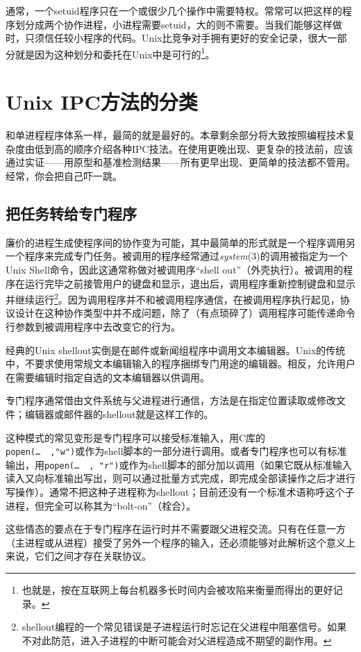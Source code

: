 \documentclass[12pt,oneside]{ctexbook}
\begin{document}
\begin{common-format}
通常，一个setuid程序只在一个或很少几个操作中需要特权。常常可以把这样的程序划分成两个协作进程，小进程需要setuid，大的则不需要。当我们能够这样做时，只须信任较小程序的代码。Unix比竞争对手拥有更好的安全记录，很大一部分就是因为这种划分和委托在Unix中是可行的\footnote{也就是，按在互联网上每台机器多长时间内会被攻陷来衡量而得出的更好记录。}。


\section{Unix IPC方法的分类}
和单进程程序体系一样，最简的就是最好的。本章剩余部分将大致按照编程技术复杂度由低到高的顺序介绍各种IPC技法。在使用更晚出现、更复杂的技法前，应该通过实证——用原型和基准检测结果——所有更早出现、更简单的技法都不管用。经常，你会把自己吓一跳。

\subsection{把任务转给专门程序}
廉价的进程生成使程序间的协作变为可能，其中最简单的形式就是一个程序调用另一个程序来完成专门任务。被调用的程序经常通过\textit{system}(3)的调用被指定为一个Unix Shell命令，因此这通常称做对被调用序“shell out”（外壳执行）。被调用的程序在运行完毕之前接管用户的键盘和显示，退出后，调用程序重新控制键盘和显示并继续运行\footnote{shellout编程的一个常见错误是子进程运行时忘记在父进程中阻塞信号。如果不对此防范，进入子进程的中断可能会对父进程造成不期望的副作用。}。因为调用程序并不和被调用程序通信，在被调用程序执行起见，协议设计在这种协作类型中并不成问题，除了（有点琐碎了）调用程序可能传递命令行参数到被调用程序中去改变它的行为。

经典的Unix shellout实倒是在邮件或新闻组程序中调用文本编辑器。Unix的传统中，不要求使用常规文本编辑输入的程序捆绑专门用途的编辑器。相反，允许用户在需要编辑时指定自选的文本编辑器以供调用。

专门程序通常借由文件系统与父进程进行通信，方法是在指定位置读取或修改文件；编辑器或邮件器的shellout就是这样工作的。

这种模式的常见变形是专门程序可以接受标准输入，用C库的\\ \verb+popen(…  ,"w")+或作为shell脚本的一部分进行调用。或者专门程序也可以有标准输出，用\verb+popen(…  , "r")+或作为shell脚本的部分加以调用（如果它既从标准输入读入又向标准输出写出，则可以通过批量方式完成，即完成全部读操作之后才进行写操作）。通常不把这种子进程称为shellout；目前还没有一个标准术语称呼这个子进程，但完全可以称其为“bolt-on”（栓合）。

这些情态的要点在于专门程序在运行时并不需要跟父进程交流。只有在任意一方（主进程或从进程）接受了另外一个程序的输入，还必须能够对此解析这个意义上来说，它们之间才存在关联协议。


\end{common-format}
\end{document}
